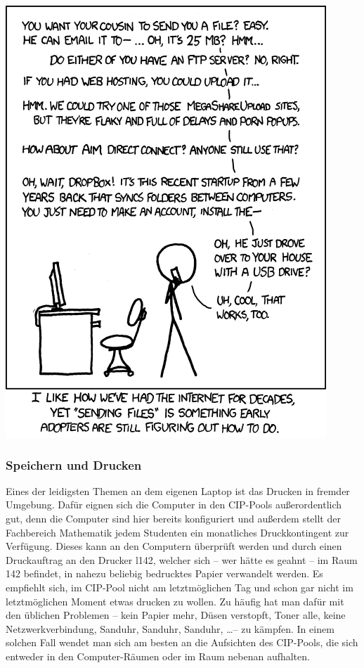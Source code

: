 
\begin{center}
\includegraphics[scale=.65]{comics/949}
\end{center}

\subsubsection{Speichern und Drucken}

Eines der leidigsten Themen an dem eigenen Laptop ist das Drucken in fremder
Umgebung. Dafür eignen sich die Computer in den CIP-Pools außerordentlich gut,
denn die Computer sind hier bereits konfiguriert und außerdem stellt der
Fachbereich Mathematik jedem Studenten ein monatliches Druckkontingent zur
Verfügung. Dieses kann an den Computern überprüft werden und durch einen
Druckauftrag an den Drucker l142, welcher sich -- wer hätte es geahnt -- im
Raum 142 befindet, in nahezu beliebig bedrucktes Papier verwandelt werden. Es
empfiehlt sich, im CIP-Pool nicht am letztmöglichen Tag und schon gar nicht im
letztmöglichen Moment etwas drucken zu wollen. Zu häufig hat man dafür mit den
üblichen Problemen -- kein Papier mehr, Düsen verstopft, Toner alle, keine
Netzwerkverbindung, Sanduhr, Sanduhr, Sanduhr, \dots -- zu kämpfen. In einem
solchen Fall wendet man sich am besten an die Aufsichten des CIP-Pools, die
sich entweder in den Computer-Räumen oder im Raum nebenan aufhalten.

